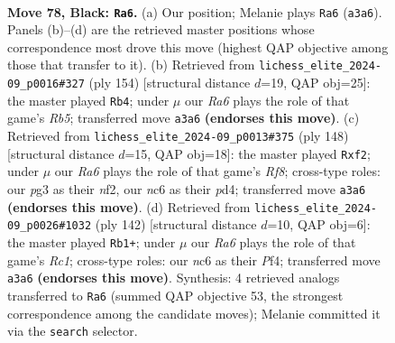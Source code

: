 \documentclass[11pt]{article}
\begin{document}
\clearpage

\begin{figure}[p]\centering
\begin{subfigure}{0.46\textwidth}\centering
\resizebox{\linewidth}{!}{%
\newchessgame
\chessboard[
  setfen={5k2/1R4p1/2N2p2/7p/3P3P/r5P1/5K2/8 b - - 50 78},
  showmover=false,
  pgfstyle=straightmove, color=movearrow, markmove={a3-a6}
]}
\caption{}
\end{subfigure}\hfill
\begin{subfigure}{0.46\textwidth}\centering
\resizebox{\linewidth}{!}{%
\newchessgame
\chessboard[
  setfen={8/8/4kpp1/1R5p/7P/3r2P1/6K1/8 w - - 22 78},
  showmover=false,
  pgfstyle=straightmove, color=movearrow, markmove={b5-b4}
]}
\caption{}
\end{subfigure}
\\[4pt]
\begin{subfigure}{0.46\textwidth}\centering
\resizebox{\linewidth}{!}{%
\newchessgame
\chessboard[
  setfen={5R2/8/1p5K/2p1k2B/2Pp4/1P4r1/5n2/8 w - - 2 75},
  showmover=false,
  pgfstyle=straightmove, color=movearrow, markmove={f8-f2}
]}
\caption{}
\end{subfigure}\hfill
\begin{subfigure}{0.46\textwidth}\centering
\resizebox{\linewidth}{!}{%
\newchessgame
\chessboard[
  setfen={8/5p2/6p1/1k4P1/2prPP2/8/4K3/2R5 w - - 0 72},
  showmover=false,
  pgfstyle=straightmove, color=movearrow, markmove={c1-b1}
]}
\caption{}
\end{subfigure}
\caption{\textbf{Move 78, Black: \texttt{Ra6}.} (a) Our position; Melanie plays \texttt{Ra6} (\texttt{a3a6}). Panels (b)--(d) are the retrieved master positions whose correspondence most drove this move (highest QAP objective among those that transfer to it). (b) Retrieved from \texttt{lichess\_elite\_2024-09\_p0016\#327} (ply 154) [structural distance $d$=19, QAP obj=25]: the master played \texttt{Rb4}; under $\mu$ our \emph{Ra6} plays the role of that game's \emph{Rb5}; transferred move \texttt{a3a6} \textbf{(endorses this move)}. (c) Retrieved from \texttt{lichess\_elite\_2024-09\_p0013\#375} (ply 148) [structural distance $d$=15, QAP obj=18]: the master played \texttt{Rxf2}; under $\mu$ our \emph{Ra6} plays the role of that game's \emph{Rf8}; cross-type roles: our \emph{p}g3 as their \emph{n}f2, our \emph{n}c6 as their \emph{p}d4; transferred move \texttt{a3a6} \textbf{(endorses this move)}. (d) Retrieved from \texttt{lichess\_elite\_2024-09\_p0026\#1032} (ply 142) [structural distance $d$=10, QAP obj=6]: the master played \texttt{Rb1+}; under $\mu$ our \emph{Ra6} plays the role of that game's \emph{Rc1}; cross-type roles: our \emph{n}c6 as their \emph{P}f4; transferred move \texttt{a3a6} \textbf{(endorses this move)}. Synthesis: 4 retrieved analogs transferred to \texttt{Ra6} (summed QAP objective 53, the strongest correspondence among the candidate moves); Melanie committed it via the \texttt{search} selector.}
\label{fig:thought-m155}
\end{figure}
\end{document}
